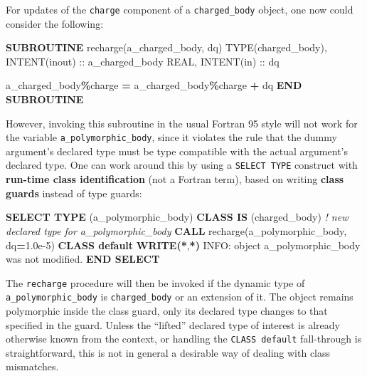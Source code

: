 \documentclass[
  paper=a4,
  ,captions=tableheading
]{scrartcl}
\newenvironment{Shaded}{\begin{snugshade}}{\end{snugshade}}
\newcommand{\CommentTok}[1]{\textcolor[rgb]{0.56,0.35,0.01}{\textit{#1}}}
\newcommand{\DataTypeTok}[1]{\textcolor[rgb]{0.13,0.29,0.53}{#1}}
\newcommand{\FloatTok}[1]{\textcolor[rgb]{0.00,0.00,0.81}{#1}}
\newcommand{\FunctionTok}[1]{\textcolor[rgb]{0.13,0.29,0.53}{\textbf{#1}}}
\newcommand{\KeywordTok}[1]{\textcolor[rgb]{0.13,0.29,0.53}{\textbf{#1}}}
\newcommand{\NormalTok}[1]{#1}
\newcommand{\OperatorTok}[1]{\textcolor[rgb]{0.81,0.36,0.00}{\textbf{#1}}}
\newcommand{\StringTok}[1]{\textcolor[rgb]{0.31,0.60,0.02}{#1}}
\begin{document}
For updates of the \texttt{charge} component of a \texttt{charged\_body}
object, one now could consider the following:

\begin{Shaded}
\begin{Highlighting}[]
\KeywordTok{SUBROUTINE}\NormalTok{ recharge(a\_charged\_body, dq)}
   \DataTypeTok{TYPE(charged\_body)}\NormalTok{, }\DataTypeTok{INTENT(inout)} \DataTypeTok{::}\NormalTok{ a\_charged\_body}
   \DataTypeTok{REAL}\NormalTok{, }\DataTypeTok{INTENT(in)} \DataTypeTok{::}\NormalTok{ dq}

\NormalTok{   a\_charged\_body}\OperatorTok{\%}\NormalTok{charge }\KeywordTok{=}\NormalTok{ a\_charged\_body}\OperatorTok{\%}\NormalTok{charge }\KeywordTok{+}\NormalTok{ dq}
\KeywordTok{END SUBROUTINE}
\end{Highlighting}
\end{Shaded}

However, invoking this subroutine in the usual Fortran 95 style will not
work for the variable \texttt{a\_polymorphic\_body}, since it violates
the rule that the dummy argument's declared type must be type compatible
with the actual argument's declared type. One can work around this by
using a \texttt{SELECT\ TYPE} construct with \textbf{run-time class
identification} (not a Fortran term), based on writing \textbf{class
guards} instead of type guards:

\begin{Shaded}
\begin{Highlighting}[]
\KeywordTok{SELECT TYPE}\NormalTok{ (a\_polymorphic\_body)}
\KeywordTok{CLASS IS}\NormalTok{ (charged\_body)  }\CommentTok{! new declared type for a\_polymorphic\_body}
   \KeywordTok{CALL}\NormalTok{ recharge(a\_polymorphic\_body, dq}\KeywordTok{=}\FloatTok{1.0e{-}5}\NormalTok{)}
\KeywordTok{CLASS default}
   \FunctionTok{WRITE(*}\NormalTok{,}\FunctionTok{*)} \StringTok{\textquotesingle{}INFO: object a\_polymorphic\_body was not modified.\textquotesingle{}}
\KeywordTok{END SELECT}
\end{Highlighting}
\end{Shaded}

The \texttt{recharge} procedure will then be invoked if the dynamic type
of \texttt{a\_polymorphic\_body} is \texttt{charged\_body} or an
extension of it. The object remains polymorphic inside the class guard,
only its declared type changes to that specified in the guard. Unless
the ``lifted'' declared type of interest is already otherwise known from
the context, or handling the \texttt{CLASS\ default} fall-through is
straightforward, this is not in general a desirable way of dealing with
class mismatches.
\end{document}
